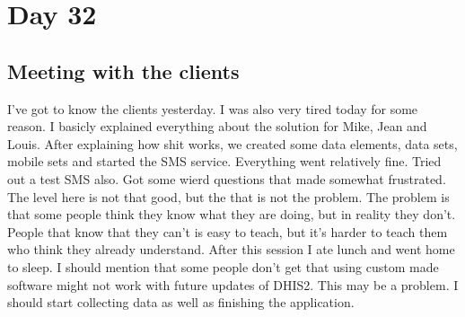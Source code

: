 \section{Day 32}
\subsection{Meeting with the clients}
I've got to know the clients yesterday.
I was also very tired today for some reason.
I basicly explained everything about the solution for Mike, Jean and Louis.
After explaining how shit works, we created some data elements, data sets, mobile sets and started the SMS service.
Everything went relatively fine.
Tried out a test SMS also.
Got some wierd questions that made somewhat frustrated.
The level here is not that good, but the that is not the problem.
The problem is that some people think they know what they are doing, but in reality they don't.
People that know that they can't is easy to teach, but it's harder to teach them who think they already understand.
After this session I ate lunch and went home to sleep.
I should mention that some people don't get that using custom made software might not work with future updates of DHIS2.
This may be a problem.
I should start collecting data as well as finishing the application.